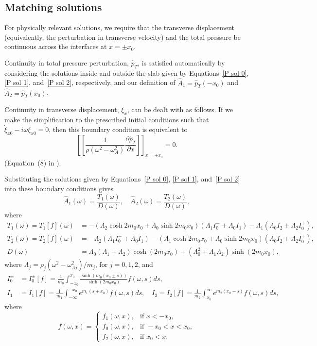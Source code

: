\documentclass[12pt]{article}
\begin{document}
\subsection{Matching solutions}
For physically relevant solutions, we require that the transverse displacement (equivalently, the perturbation in transverse velocity) and the total pressure be continuous across the interfaces at $x = \pm x_0$.

Continuity in total pressure perturbation, $\hat{p}_T$, is satisfied automatically by considering the solutions inside and outside the slab given by Equations~\eqref{P sol 0}, \eqref{P sol 1}, and~\eqref{P sol 2}, respectively, and our definition of $\hat{A}_1 = \hat{p}_T(-x_0)$ and $\hat{A}_2 = \hat{p}_T(x_0)$.

Continuity in transverse displacement, $\xi_x$, can be dealt with as follows. If we make the simplification to the prescribed initial conditions such that $\dot{\xi}_{x0} - i\omega\xi_{x0} = 0$, then this boundary condition is equivalent to
\begin{equation}
\left[ \left[ \frac{1}{\rho(\omega^2 - \omega_A^2)} \frac{\partial \hat{p}_T}{\partial x} \right] \right]_{x=\pm x_0} = 0.
\end{equation}
(Equation~(8) in \cite{and_etal07}).

Substituting the solutions given by Equations~\eqref{P sol 0}, \eqref{P sol 1}, and~\eqref{P sol 2} into these boundary conditions gives
\begin{equation}
\hat{A}_1(\omega) = \frac{T_1(\omega)}{D(\omega)}, \quad \hat{A}_2(\omega) = \frac{T_2(\omega)}{D(\omega)},
\end{equation}
where
\begin{align}
T_1(\omega) = T_1[f](\omega) & = -(\Lambda_2\cosh{2m_0 x_0} + \Lambda_0\sinh{2m_0 x_0})(\Lambda_1 I_0^- + \Lambda_0 I_1) - \Lambda_1(\Lambda_0 I_2 + \Lambda_2 I_0^+), \\
T_2(\omega) = T_2[f](\omega) & = -\Lambda_2(\Lambda_1 I_0^- + \Lambda_0 I_1) - (\Lambda_1\cosh{2m_0 x_0} + \Lambda_0\sinh{2m_0 x_0})(\Lambda_0 I_2 + \Lambda_2 I_0^+), \\
D(\omega) & = \Lambda_0(\Lambda_1 + \Lambda_2)\cosh(2m_0x_0) + (\Lambda_0^2 + \Lambda_1\Lambda_2)\sinh(2m_0x_0),
\label{D}
\end{align}
where $\Lambda_j = \rho_j (\omega^2 - \omega_{Aj}^2) /  m_j$, for $j = 0, 1, 2$, and
\begin{align}
I_0^\pm &= I_0^\pm[f] = \frac{1}{m_0} \int_{-x_0}^{x_0} \frac{\sinh(m_0(x_0 \pm s))}{\sinh(2m_0x_0)} f(\omega, s) ds, \\
I_1 &= I_1[f] = \frac{1}{m_1} \int_{-\infty}^{-x_0} e^{m_1(s + x_0)} f(\omega, s) ds,
\quad
I_2 = I_2[f] = \frac{1}{m_2} \int_{x_0}^\infty e^{m_2(x_0 - s)} f(\omega, s) ds,
\end{align}
where
\begin{equation}
f(\omega, x) = \begin{cases}
f_1(\omega, x), &\text{if } x < -x_0, \\
f_0(\omega, x), &\text{if } -x_0 < x < x_0, \\
f_2(\omega, x), &\text{if } x_0 < x.
\end{cases}
\end{equation}
\end{document}

